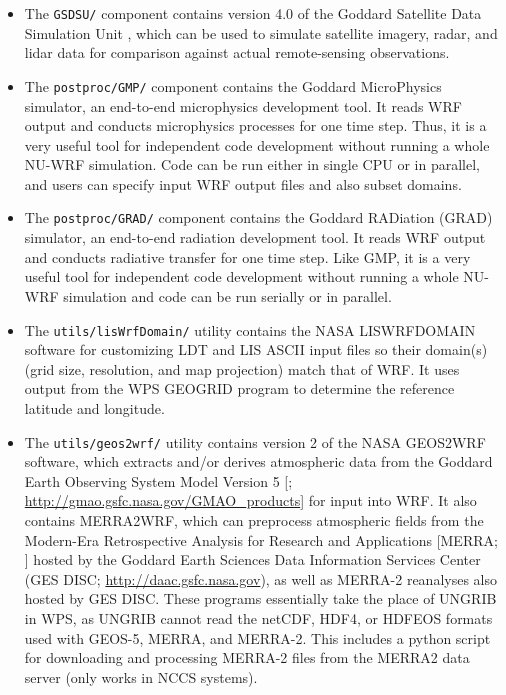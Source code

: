 \begin{itemize}
\item The \texttt{GSDSU/} component contains version 4.0 of the Goddard 
  Satellite Data Simulation Unit \citep{ref:GsdsuUserGuide}, which can be used
  to simulate satellite imagery, radar, and lidar data for comparison against 
  actual remote-sensing observations.

\item The \texttt{postproc/GMP/}  component contains the Goddard MicroPhysics 
simulator, an end-to-end microphysics development tool. It reads WRF output 
and conducts microphysics processes for one time step. Thus, it is a very useful 
tool for independent code development without running a whole NU-WRF simulation. 
Code can be run either in single CPU or in parallel, and users can specify
 input WRF output files and also subset domains.

\item The \texttt{postproc/GRAD/}  component contains the Goddard RADiation (GRAD) simulator,
an end-to-end radiation development tool. It reads WRF output and conducts radiative transfer 
for one time step. Like GMP, it is a very useful tool for independent code development without running 
a whole NU-WRF simulation and code can be run serially or in parallel.
 
 \item The \texttt{utils/lisWrfDomain/} utility contains the NASA LISWRFDOMAIN 
  software for customizing LDT and LIS ASCII input files so their domain(s) 
  (grid size, resolution, and map projection) match that of WRF.  It uses 
  output from the WPS GEOGRID program to determine the reference latitude and 
  longitude.

\item The \texttt{utils/geos2wrf/} utility contains version 2 of the NASA
  GEOS2WRF software, which extracts and/or derives atmospheric data from the
  Goddard Earth Observing System Model Version 5 [\cite{ref:RieneckerEtAl2008};
  \url{http://gmao.gsfc.nasa.gov/GMAO\_products}] for input into WRF. It also 
  contains MERRA2WRF, which can preprocess atmospheric fields from the 
  Modern-Era Retrospective Analysis for Research and Applications [MERRA; 
  \cite{ref:RieneckerEtAl2011}] hosted by the Goddard Earth Sciences Data 
  Information Services Center (GES DISC; \url{http://daac.gsfc.nasa.gov}), as 
  well as MERRA-2 reanalyses \citep{ref:BosilovichEtAl2015} also hosted by 
  GES DISC. These programs essentially take the place of UNGRIB in WPS, as 
  UNGRIB cannot read the netCDF, HDF4, or HDFEOS formats used with GEOS-5, 
  MERRA, and MERRA-2.  This includes a python script for downloading and
  processing MERRA-2 files from the MERRA2 data server (only works in NCCS
  systems).


\end{itemize}
